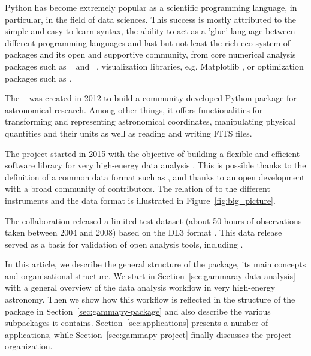\documentclass[traditabstract, longauth]{aa}
\begin{document}
Python has become extremely popular as a scientific programming language,
in particular, in the field of data sciences. This success is
mostly attributed to the simple and easy to learn syntax, the ability to act as
a 'glue' language between different programming languages and last but not least
the rich eco-system of packages and its open and supportive community, from
core numerical analysis packages such as \numpy~\citep{numpy} and
\scipy~\citep{2020SciPy-NMeth}, visualization libraries, e.g. Matplotlib \citep{matplotlib},
or optimization packages such as \iminuit \citep{iminuit}.

The \astropy~\citep{astropy} was created in 2012 to build a community-developed
Python package for astronomical research. Among other things, it offers functionalities for
transforming and representing astronomical coordinates, manipulating physical quantities
and their units as well as reading and writing FITS files.


The \gammapy project started in 2015 with the objective of building a flexible and
efficient software library for very high-energy \gammaray data analysis \citep{gammapy_2015}.
This is possible thanks to the definition of a common data format such as \gadf, and thanks to
an open development with a broad community of contributors. The relation of \gammapy to the
different instruments and the \gadf data format is illustrated in Figure~\ref{fig:big_picture}.


The \hess collaboration released a limited test dataset (about 50 hours of
observations taken between 2004 and 2008) based  on the \gadf DL3 format \citep{HESS_DR1}.
This data release served as a basis for validation of open analysis tools,
including \gammapy \cite[see e.g.][]{Mohrmann2019}.

In this article, we describe the general structure of the \gammapy package,
its main concepts and organisational structure. We start in
Section~\ref{sec:gammaray-data-analysis} with a general overview
of the data analysis workflow in very high-energy \gammaray astronomy. Then we
show how this workflow is reflected in the structure of the \gammapy package 
in Section~\ref{sec:gammapy-package} and also
describe the various subpackages it contains. Section~\ref{sec:applications}
presents a number of applications, while Section~\ref{sec:gammapy-project}
finally discusses the project organization.
\end{document}
